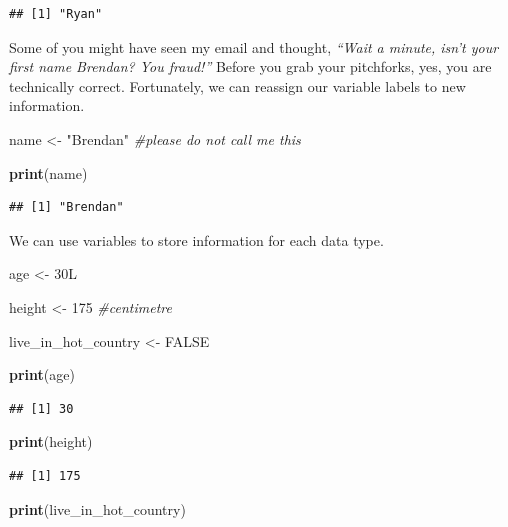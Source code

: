 \documentclass[
]{book}
\newenvironment{Shaded}{\begin{snugshade}}{\end{snugshade}}
\newcommand{\CommentTok}[1]{\textcolor[rgb]{0.56,0.35,0.01}{\textit{#1}}}
\newcommand{\ConstantTok}[1]{\textcolor[rgb]{0.56,0.35,0.01}{#1}}
\newcommand{\DataTypeTok}[1]{\textcolor[rgb]{0.13,0.29,0.53}{#1}}
\newcommand{\DecValTok}[1]{\textcolor[rgb]{0.00,0.00,0.81}{#1}}
\newcommand{\FunctionTok}[1]{\textcolor[rgb]{0.13,0.29,0.53}{\textbf{#1}}}
\newcommand{\NormalTok}[1]{#1}
\newcommand{\OtherTok}[1]{\textcolor[rgb]{0.56,0.35,0.01}{#1}}
\newcommand{\StringTok}[1]{\textcolor[rgb]{0.31,0.60,0.02}{#1}}
\begin{document}
\begin{verbatim}
## [1] "Ryan"
\end{verbatim}

Some of you might have seen my email and thought, \emph{``Wait a minute, isn't your first name Brendan? You fraud!''} Before you grab your pitchforks, yes, you are technically correct. Fortunately, we can reassign our variable labels to new information.

\begin{Shaded}
\begin{Highlighting}[]
\NormalTok{name }\OtherTok{\textless{}{-}} \StringTok{"Brendan"} \CommentTok{\#please do not call me this}

\FunctionTok{print}\NormalTok{(name)}
\end{Highlighting}
\end{Shaded}

\begin{verbatim}
## [1] "Brendan"
\end{verbatim}

We can use variables to store information for each data type.

\begin{Shaded}
\begin{Highlighting}[]
\NormalTok{age }\OtherTok{\textless{}{-}} \DecValTok{30}\DataTypeTok{L}

\NormalTok{height }\OtherTok{\textless{}{-}} \DecValTok{175} \CommentTok{\#centimetre }

\NormalTok{live\_in\_hot\_country }\OtherTok{\textless{}{-}} \ConstantTok{FALSE}

\FunctionTok{print}\NormalTok{(age)}
\end{Highlighting}
\end{Shaded}

\begin{verbatim}
## [1] 30
\end{verbatim}

\begin{Shaded}
\begin{Highlighting}[]
\FunctionTok{print}\NormalTok{(height)}
\end{Highlighting}
\end{Shaded}

\begin{verbatim}
## [1] 175
\end{verbatim}

\begin{Shaded}
\begin{Highlighting}[]
\FunctionTok{print}\NormalTok{(live\_in\_hot\_country)}
\end{Highlighting}
\end{Shaded}
\end{document}

